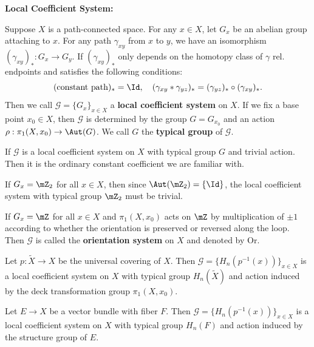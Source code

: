 \noindent\textbf{Local Coefficient System:}

Suppose $X$ is a path-connected space. For any $x\in X$, let $G_x$ be an 
abelian group attaching to $x$. For any path $\gamma_{xy}$ from $x$ to $y$, 
we have an isomorphism $(\gamma_{xy})_*:G_x\to G_y$. If $(\gamma_{xy})_*$ 
only depends on the homotopy class of $\gamma$ rel. endpoints and satisfies 
the following conditions: 
\begin{equation*}
    (\text{constant path})_* = \Id, \quad
    (\gamma_{xy}*\gamma_{yz})_* = (\gamma_{yz})_*\circ(\gamma_{xy})_*.
\end{equation*}
Then we call $\mathcal{G} = \{G_x\}_{x\in X}$ a 
\textbf{local coefficient system} on $X$. If we fix a base point $x_0\in X$, 
then $\mathcal{G}$ is determined by the group $G = G_{x_0}$ and an action 
$\rho:\pi_1(X,x_0)\to \Aut(G)$. We call $G$ the \textbf{typical group} of 
$\mathcal{G}$. 

\begin{example}
    If $\mathcal{G}$ is a local coefficient system on $X$ with typical group 
    $G$ and trivial action. Then it is the ordinary constant coefficient we 
    are familiar with.
\end{example}

\begin{example}
    If $G_x = \mZ_2$ for all $x\in X$, then since $\Aut(\mZ_2)=\{\Id\}$, 
    the local coefficient system with typical group $\mZ_2$ must be trivial. 
\end{example}

\begin{example}
    If $G_x = \mZ$ for all $x\in X$ and $\pi_1(X,x_0)$ acts on $\mZ$ by
    multiplication of $\pm 1$ according to whether the orientation is
    preserved or reversed along the loop. Then $\mathcal{G}$ is called the 
    \textbf{orientation system} on $X$ and denoted by $\mathrm{Or}$. 
\end{example}

\begin{example}
    Let $p:\tilde{X}\to X$ be the universal covering of $X$. Then 
    $\mathcal{G} = \{H_n(p^{-1}(x))\}_{x\in X}$ is a local coefficient system 
    on $X$ with typical group $H_n(\tilde{X})$ and action induced by the 
    deck transformation group $\pi_1(X,x_0)$. 
\end{example}

\begin{example}
    Let $E\to X$ be a vector bundle with fiber $F$. Then 
    $\mathcal{G} = \{H_n(p^{-1}(x))\}_{x\in X}$ is a local coefficient system 
    on $X$ with typical group $H_n(F)$ and action induced by the structure 
    group of $E$.
\end{example}

